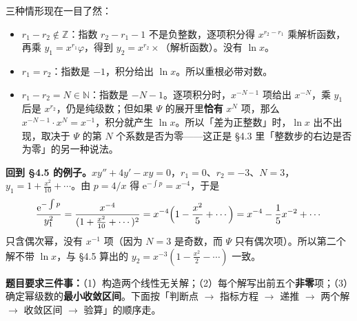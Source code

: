 \documentclass[11pt]{ctexart}
\renewcommand{\qbreak}{\needspace{0.26\textheight}}
\newcommand{\ee}{\mathrm{e}}
\newcommand{\Z}{\mathbb{Z}}
\newcommand{\N}{\mathbb{N}}
\begin{document}
三种情形现在一目了然：
\begin{itemize}
  \item \textbf{$r_1-r_2\notin\Z$}：指数 $r_2-r_1-1$ 不是负整数，逐项积分得 $x^{r_2-r_1}$ 乘解析函数，再乘 $y_1=x^{r_1}\varphi$，得到 $y_2=x^{r_2}\times$（解析函数）。没有 $\ln x$。
  \item \textbf{$r_1=r_2$}：指数是 $-1$，积分给出 $\ln x$。所以重根必带对数。
  \item \textbf{$r_1-r_2=N\in\N$}：指数是 $-N-1$。逐项积分时，$x^{-N-1}$ 项给出 $x^{-N}$，乘 $y_1$ 后是 $x^{r_2}$，仍是纯级数；但如果 $\Psi$ 的展开里\textbf{恰有} $x^N$ 项，那么 $x^{-N-1}\cdot x^N=x^{-1}$，积分就产生 $\ln x$。所以「差为正整数」时，$\ln x$ 出不出现，取决于 $\Psi$ 的第 $N$ 个系数是否为零——这正是 §4.3 里「整数步的右边是否为零」的另一种说法。
\end{itemize}

\textbf{回到 §4.5 的例子。}$xy''+4y'-xy=0$，$r_1=0$、$r_2=-3$、$N=3$，$y_1=1+\frac{x^2}{10}+\cdots$。由 $p=4/x$ 得 $\ee^{-\int p}=x^{-4}$，于是
\[
\frac{\ee^{-\int p}}{y_1^2}=\frac{x^{-4}}{(1+\frac{x^2}{10}+\cdots)^2}
=x^{-4}\Bigl(1-\frac{x^2}{5}+\cdots\Bigr)
=x^{-4}-\frac15x^{-2}+\cdots
\]
只含偶次幂，没有 $x^{-1}$ 项（因为 $N=3$ 是奇数，而 $\Psi$ 只有偶次项）。所以第二个解不带 $\ln x$，与 §4.5 算出的 $y_2=x^{-3}(1-\frac{x^2}{2}-\cdots)$ 一致。


\qbreak
{}


\textbf{题目要求三件事：}（1）构造两个线性无关解；（2）每个解写出前五个\textbf{非零}项；（3）确定幂级数的\textbf{最小收敛区间}。下面按「判断点 $\to$ 指标方程 $\to$ 递推 $\to$ 两个解 $\to$ 收敛区间 $\to$ 验算」的顺序走。
\end{document}
